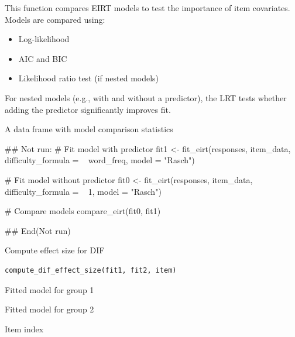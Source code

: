 \documentclass[a4paper]{book}
\begin{document}
%
\begin{Details}
This function compares EIRT models to test the importance of item covariates.
Models are compared using:
\begin{itemize}

\item{} Log-likelihood
\item{} AIC and BIC
\item{} Likelihood ratio test (if nested models)

\end{itemize}


For nested models (e.g., with and without a predictor), the LRT tests
whether adding the predictor significantly improves fit.
\end{Details}
%
\begin{Value}
A data frame with model comparison statistics
\end{Value}
%
\begin{Examples}
\begin{ExampleCode}
## Not run: 
# Fit model with predictor
fit1 <- fit_eirt(responses, item_data,
                 difficulty_formula = ~ word_freq,
                 model = "Rasch")

# Fit model without predictor
fit0 <- fit_eirt(responses, item_data,
                 difficulty_formula = ~ 1,
                 model = "Rasch")

# Compare models
compare_eirt(fit0, fit1)

## End(Not run)

\end{ExampleCode}
\end{Examples}
%
\begin{Description}
Compute effect size for DIF
\end{Description}
%
\begin{Usage}
\begin{verbatim}
compute_dif_effect_size(fit1, fit2, item)
\end{verbatim}
\end{Usage}
%
\begin{Arguments}
\begin{ldescription}
\item[\code{fit1}] Fitted model for group 1

\item[\code{fit2}] Fitted model for group 2

\item[\code{item}] Item index
\end{ldescription}
\end{Arguments}
\end{document}
